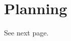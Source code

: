 \documentclass[en]{customTemplate}
\begin{document}
\section{Planning}   

See next page.



\printglossary[type=\acronymtype]
\printglossary
\printbibliography{}
\end{document}
